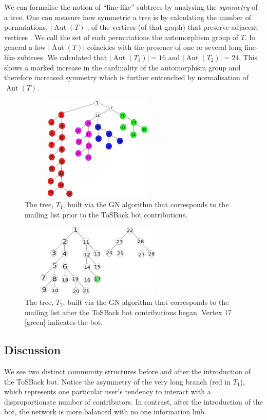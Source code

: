 \documentclass{sig-alternate}
\DeclareMathOperator{\Aut}{Aut}
\begin{document}
We can formalise the notion of “line-like” subtrees by analysing the \emph{symmetry} of  
a tree.  One can measure how symmetric
a tree is by calculating the number of permutations, $\lvert \Aut(T) \rvert$, of the
vertices (of that graph) that preserve adjacent vertices \cite{bela:mgt}. We
call the set of such permutations the automorphism group of $T$. In general a low $\lvert \Aut(T) \rvert$ coincides with the presence of one or several long line-like subtrees.  We calculated that $\lvert \Aut(T_1)\rvert = 16$ and $\vert \Aut(T_2)\rvert = 24$.  This shows a marked
increase in the cardinality of the automorphism group and
therefore increased symmetry which is further entrenched by normalisation of $\Aut(T)$.
\begin{figure}[H]
\includegraphics[width=7.5cm, height  = 5cm]{t15.pdf}\caption{ The tree, $T_1$, built via the GN algorithm that corresponds to the mailing list prior to the ToSBack bot contributions.}\label{fig:t1}
\end{figure}
\begin{figure}[H]
\includegraphics[width=7.5cm, height=3.5cm]{t26.pdf}\caption[width=7]{ The tree, $T_2$, built via the GN algorithm that corresponds to the mailing list after the ToSBack bot contributions began.  Vertex 17 [green] indicates the bot. }\label{fig:t2}
\end{figure}

\subsection{Discussion}
We see two distinct community structures before and after the introduction of the ToSBack bot. Notice the asymmetry of the very long branch (red in $T_1$), which represents one particular user's tendency to interact with a disproportionate number of contributors. In contrast, after the introduction of the bot, the network is more balanced with no one information hub. %
\end{document}
